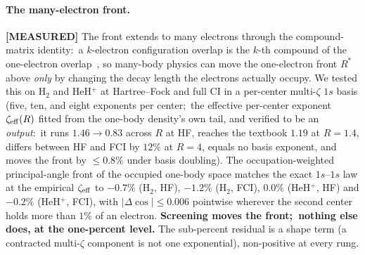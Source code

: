 \documentclass[aps,pra,twocolumn,superscriptaddress,longbibliography]{revtex4-2}
\newcommand{\gvq}[2]{#2}
\begin{document}
\paragraph{The many-electron front.}
\textbf{[MEASURED]} The front extends to many electrons through the
compound-matrix identity:\ a $k$-electron configuration overlap is the
$k$-th compound of the one-electron
overlap~\cite{lowdin1955,prosser_hagstrom1968,king1967,burton2021}, so
many-body physics can move the one-electron front $R^{*}$ above \emph{only}
by changing the decay length the electrons actually occupy.  We tested this
on H$_2$ and HeH$^+$ at Hartree--Fock and full CI in a per-center
multi-$\zeta$ $1s$ basis (five, ten, and eight exponents per center;\ the
effective per-center exponent $\zeta_{\rm eff}(R)$ fitted from the one-body
density's own tail, and verified to be an \emph{output}:\ it runs
$1.46 \to 0.83$ across $R$ at HF, reaches the textbook $1.19$ at $R = 1.4$,
differs between HF and FCI by $12\%$ at $R = 4$, equals no basis exponent,
and moves the front by $\le 0.8\%$ under basis doubling).  The
occupation-weighted principal-angle front of the occupied one-body space
matches the exact $1s$--$1s$ law at the empirical $\zeta_{\rm eff}$ to
$\gvq{front_resid_h2_hf}{-0.7}\%$ (H$_2$, HF),
$\gvq{front_resid_h2_fci}{-1.2}\%$ (H$_2$, FCI),
$\gvq{front_resid_heh_hf}{0.0}\%$ (HeH$^+$, HF) and
$\gvq{front_resid_heh_fci}{-0.2}\%$ (HeH$^+$, FCI), with
$|\Delta\cos| \le 0.006$ pointwise wherever the second center holds more
than $1\%$ of an electron.  \textbf{Screening moves the front;\ nothing
else does, at the one-percent level.}  The sub-percent residual is a shape
term (a contracted multi-$\zeta$ component is not one exponential),
non-positive at every rung.
\end{document}
